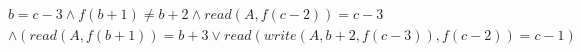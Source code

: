 \begin{align*}
%
& %
b = c - 3
%
\land
%
f(b + 1)  \neq  b + 2
%
\land
%
\mathit{read}(A,f(c - 2)) = c - 3
~\\~
& %
%
\land
%
(\mathit{read}(A,f(b + 1)) = b + 3 \lor \mathit{read}(\mathit{write}(A,b + 2,f(c - 3)),f(c - 2)) = c - 1)
%
\end{align*}
